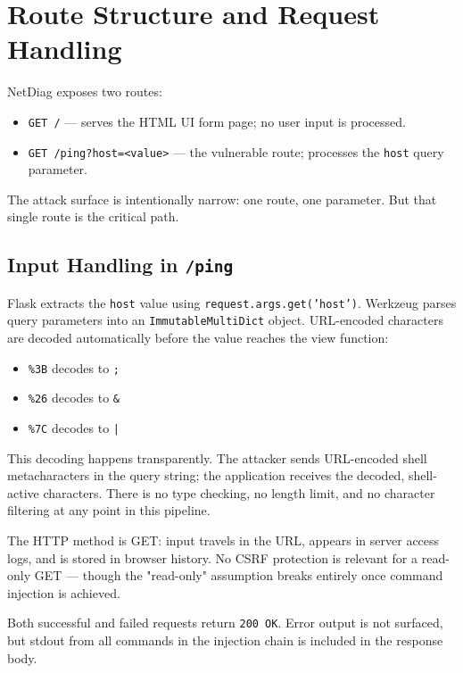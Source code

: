 \section{Route Structure and Request Handling}

NetDiag exposes two routes:

\begin{itemize}
    \item \texttt{GET /} --- serves the HTML UI form page; no user input is processed.
    \item \texttt{GET /ping?host=<value>} --- the vulnerable route; processes the \texttt{host} query parameter.
\end{itemize}

The attack surface is intentionally narrow: one route, one parameter. But that single route is the critical path.

\subsection{Input Handling in \texttt{/ping}}

Flask extracts the \texttt{host} value using \texttt{request.args.get('host')}. Werkzeug parses query parameters into an \texttt{ImmutableMultiDict} object. URL-encoded characters are decoded automatically before the value reaches the view function:

\begin{itemize}
    \item \texttt{\%3B} decodes to \texttt{;}
    \item \texttt{\%26} decodes to \texttt{\&}
    \item \texttt{\%7C} decodes to \texttt{|}
\end{itemize}

This decoding happens transparently. The attacker sends URL-encoded shell metacharacters in the query string; the application receives the decoded, shell-active characters. There is no type checking, no length limit, and no character filtering at any point in this pipeline.

The HTTP method is GET: input travels in the URL, appears in server access logs, and is stored in browser history. No CSRF protection is relevant for a read-only GET --- though the "read-only" assumption breaks entirely once command injection is achieved.

Both successful and failed requests return \texttt{200 OK}. Error output is not surfaced, but stdout from all commands in the injection chain is included in the response body.

